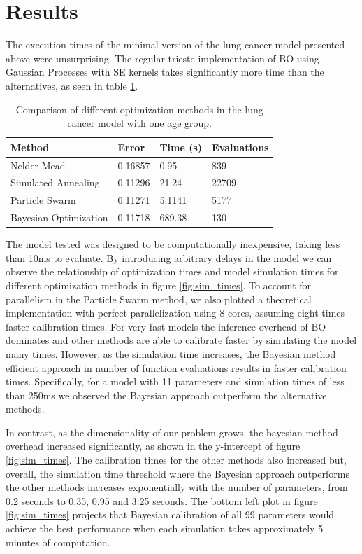 \documentclass{IOS-Book-Article}
\begin{document}
	\section{Results}
	The execution times of the minimal version of the lung cancer model presented above were unsurprising. The regular trieste implementation of BO using Gaussian Processes with SE kernels takes significantly more time than the alternatives, as seen in table \ref{tab:result-methods}.
		
	\begin{table}[h!]
		\centering
		\begin{tabular}{llll} 
			\hline
			Method & Error & Time (s) & Evaluations \\ 
			\hline
			Nelder-Mead & 0.16857 & 0.95 & 839 \\ 
			Simulated Annealing & 0.11296 & 21.24 & 22709 \\ 
			Particle Swarm & 0.11271 & 5.1141 & 5177 \\
			Bayesian Optimization & 0.11718 & 689.38 & 130 \\
			\hline
		\end{tabular}
		\caption{Comparison of different optimization methods in the lung cancer model with one age group.}
		\label{tab:result-methods}
	\end{table}
	
	The model tested was designed to be computationally inexpensive, taking less than 10ms to evaluate. By introducing arbitrary delays in the model we can observe the relationship of optimization times and model simulation times for different optimization methods in figure \ref{fig:sim_times}. To account for parallelism in the Particle Swarm method, we also plotted a theoretical implementation with perfect parallelization using 8 cores, assuming eight-times faster calibration times. For very fast models the inference overhead of BO dominates and other methods are able to calibrate faster by simulating the model many times. However, as the simulation time increases, the Bayesian method efficient approach in number of function evaluations results in faster calibration times. Specifically, for a model with 11 parameters and simulation times of less than 250ms we observed the Bayesian approach outperform the alternative methods.
	
	In contrast, as the dimensionality of our problem grows, the bayesian method overhead increased significantly, as shown in the y-intercept of figure \ref{fig:sim_times}. The calibration times for the other methods also increased but, overall, the simulation time threshold where the Bayesian approach outperforms the other methods increases exponentially with the number of parameters, from 0.2 seconds to 0.35, 0.95 and 3.25 seconds. The bottom left plot in figure \ref{fig:sim_times} projects that Bayesian calibration of all 99 parameters would achieve the best performance when each simulation takes approximately 5 minutes of computation.
	
\end{document}
